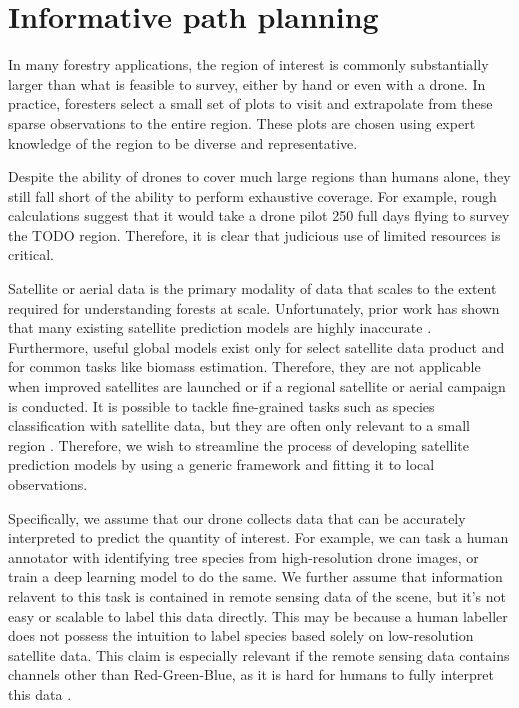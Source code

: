 \section{Informative path planning}

In many forestry applications, the region of interest is commonly substantially larger than what is feasible to survey, either by hand or even with a drone. In practice, foresters  select a small set of plots to visit and extrapolate from these sparse observations to the entire region. These plots are chosen using expert knowledge of the region to be diverse and representative.

Despite the ability of drones to cover much large regions than humans alone, they still fall short of the ability to perform  exhaustive coverage. For example, rough calculations suggest that it would take a drone pilot 250 full days flying to survey the TODO region. Therefore, it is clear that judicious use of limited resources is critical.

Satellite or aerial data is the primary modality of data that scales to the extent required for understanding forests at scale. Unfortunately, prior work has shown that many existing satellite prediction models are highly inaccurate \cite{}. Furthermore, useful global models exist only for select satellite data product and for common tasks like biomass estimation. Therefore, they are not applicable when improved satellites are launched or if a regional satellite or aerial campaign is conducted.
It is possible to tackle fine-grained tasks such as species classification with satellite data, but they are often only relevant to a small region \cite{Sweden}. 
Therefore, we wish to streamline the process of developing satellite prediction models by using a generic framework and fitting it to local observations.

Specifically, we assume that our drone collects data that can be accurately interpreted to predict the quantity of interest. For example, we can task a human annotator with identifying tree species from high-resolution drone images, or train a deep learning model to do the same. We further assume that information relavent to this task is contained in remote sensing data of the scene, but it's not easy or scalable to label this data directly. This may be because a human labeller does not possess the intuition to label species based solely on low-resolution satellite data. This claim is especially relevant if the remote sensing data contains channels other than Red-Green-Blue, as it is hard for humans to fully interpret this data \cite{Hard to label multispectral}.


